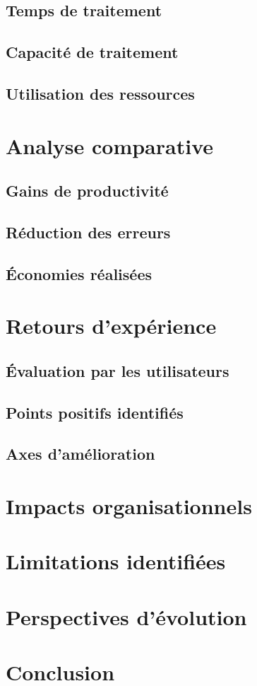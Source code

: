 \subsection{Temps de traitement}

\subsection{Capacité de traitement}

\subsection{Utilisation des ressources}

\section{Analyse comparative}

\subsection{Gains de productivité}

\subsection{Réduction des erreurs}

\subsection{Économies réalisées}

\section{Retours d'expérience}

\subsection{Évaluation par les utilisateurs}

\subsection{Points positifs identifiés}

\subsection{Axes d'amélioration}

\section{Impacts organisationnels}

\section{Limitations identifiées}

\section{Perspectives d'évolution}

\section{Conclusion}